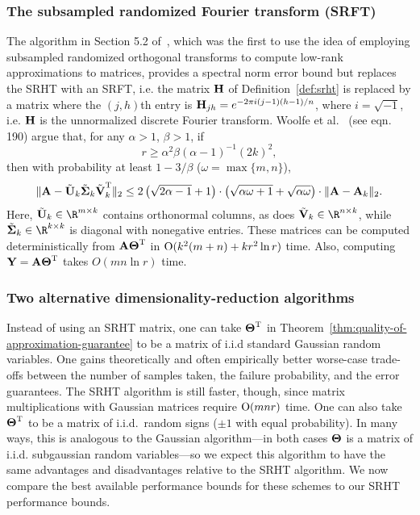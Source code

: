 \subsubsection{The subsampled randomized Fourier transform (SRFT)}
The algorithm in Section 5.2 of~\cite{WLRT07},
which was the first to use the idea of employing subsampled randomized orthogonal transforms to compute low-rank approximations to matrices,
provides a spectral norm error bound but replaces the SRHT with an SRFT, i.e. the matrix ${\bm{\mathrm{H}}}$ of Definition~\ref{def:srht} is replaced by a matrix
where the $(j,h)$th entry is ${\bm{\mathrm{H}}}_{jh} = e^{- 2 \pi i (j-1) (h-1)/n }$, where $i = \sqrt{-1}$, i.e. ${\bm{\mathrm{H}}}$ is the unnormalized discrete Fourier transform.
Woolfe et al.~\cite{WLRT07} (see eqn. 190) argue that, for any $\alpha > 1$, $\beta > 1$,
if
$$r \ge \alpha^2 \beta \left( \alpha-1 \right)^{-1} (2k)^2,$$
then with probability at least $1 - 3/\beta$ ($\omega = \max\{m,n\}$),
$$ \mbox{}\| {\bm{\mathrm{A}}} - \tilde{{\bm{\mathrm{U}}}}_k \tilde{{\bm{\mathrm{\Sigma}}}}_k \tilde{{\bm{\mathrm{V}}}}_k^{\textsc{T}} \|_2 \le
2 \left( \sqrt{2\alpha-1} + 1 \right) \cdot \left( \sqrt{\alpha \omega +1} + \sqrt{ \alpha \omega } \right) \cdot \mbox{}\|{\bm{\mathrm{A}}} - {\bm{\mathrm{A}}}_k\|_2.$$
Here, $\tilde{\matU}_k \in \R^{m \times k}$ contains orthonormal columns, as does $\tilde{\matV}_k \in \R^{n \times k}$, while
$\tilde{\matSig}_k \in \R^{k \times k} $ is diagonal with nonegative entries. These matrices can be computed deterministically from ${\bm{\mathrm{A}}} {\bm{\mathrm{\Theta}}}^{\textsc{T}}$
in $\mathrm{O}( k^2(m+n) + k r^2 \ln r)$ time. Also, computing ${\bm{\mathrm{Y}}} = {\bm{\mathrm{A}}} {\bm{\mathrm{\Theta}}}^{\textsc{T}}$ takes $O( m n \ln r)$ time.

\subsubsection{Two alternative dimensionality-reduction algorithms}
Instead of using an SRHT matrix, one can take ${\bm{\mathrm{\Theta}}}^{\textsc{T}}$  in Theorem~\ref{thm:quality-of-approximation-guarantee} to be a matrix of i.i.d standard Gaussian random variables. One gains theoretically and often empirically better worse-case trade-offs between the number of samples taken, the failure probability, and the error guarantees. The SRHT algorithm is still faster, though, since matrix multiplications with Gaussian matrices require $\mathrm{O}(mnr)$ time.
One can also take ${\bm{\mathrm{\Theta}}}^{\textsc{T}}$ to be a matrix of i.i.d.~random signs ($\pm 1$ with equal probability). In many ways, this is analogous to the Gaussian algorithm---in both cases ${\bm{\mathrm{\Theta}}}$ is a matrix of i.i.d. subgaussian random variables---so we expect this algorithm to have the same advantages and disadvantages relative to the SRHT algorithm. We now compare the best available performance bounds for these schemes to our SRHT performance bounds.

